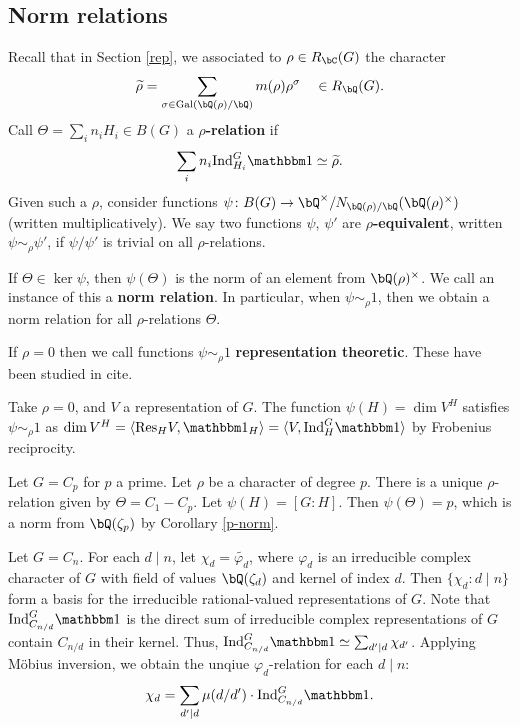 \subsection{Norm relations}

Recall that in Section \ref{rep}, we associated to $\rho \in R_{\bC}(G)$ the character
    \[ \widetilde{\rho} = \sum_{\sigma \in \Gal(\bQ(\rho) / \bQ)} m(\rho) \rho^{\sigma} \quad \in R_{\bQ}(G) .\]
 Call $\Theta = \sum_i n_i H_i \in B(G)$ a \textbf{$\rho$-relation} if 
    \[ \sum_i n_i \Ind_{H_i}^G \trivial \simeq \widetilde{\rho}. \]
Given such a $\rho$, consider functions $\psi \colon B(G) \to \bQ^{\times} / N_{\bQ(\rho) / \bQ}(\bQ(\rho)^\times)$ (written multiplicatively). We say two functions $\psi$, $\psi'$ are \textbf{$\rho$-equivalent}, written $\psi \sim_{\rho} \psi'$, if $\psi / \psi'$ is trivial on all $\rho$-relations. 

If $\Theta \in \ker \psi$, then $\psi(\Theta)$ is the norm of an element from $\bQ(\rho)^{\times}$. We call an instance of this a \textbf{norm relation}.
In particular, when $\psi \sim_{\rho} 1$, then we obtain a norm relation for all $\rho$-relations $\Theta$. 

\begin{rem}
    If $\rho = 0$ then we call functions $\psi \sim_{\rho} 1$ \textbf{representation theoretic}. These have been studied in {\color{red} cite}.
\end{rem}

\begin{example}
  Take $\rho = 0$, and $V$ a representation of $G$. The function $\psi(H) = \dim V^H$ satisfies $\psi \sim_{\rho} 1$ as $\dim V^H = \langle \Res_{H} V , \trivial_H \rangle = \langle V, \Ind_{H}^G \trivial \rangle$ by Frobenius reciprocity.
\end{example}

\begin{example}
    Let $G = C_p$ for $p$ a prime. Let $\rho$ be a character of degree $p$. There is a unique $\rho$-relation given by $\Theta = C_1 - C_p$. Let $\psi(H) = [G \colon H]$. Then $\psi(\Theta) = p$, which is a norm from $\bQ(\zeta_p)$ by Corollary \ref{p-norm}. 
\end{example}

\begin{example}\label{cyclic-relns}
Let $G = C_n$. For each $d \mid n$, let $\chi_d = \widetilde{\varphi_d}$, where $\varphi_d$ is an irreducible complex character of $G$ with field of values $\bQ(\zeta_d)$ and kernel of index $d$.
Then $\{ \chi_d \colon d\mid n \}$ form a basis for the irreducible rational-valued representations of $G$. Note that $\Ind_{C_{n/ d}}^G \trivial$ is the direct sum of irreducible complex representations of $G$ contain $C_{n / d}$ in their kernel. Thus, $\Ind_{C_{n/ d}}^G \trivial \simeq \sum_{d' \mid d} \chi_{d'}$. Applying M\"{o}bius inversion, we obtain the unqiue $\varphi_d$-relation for each $d \mid n$:
\[ \chi_d = \sum_{d' \mid d} \mu(d / d') \cdot \Ind_{C_{n/ d}}^G \trivial. \]
\end{example}

